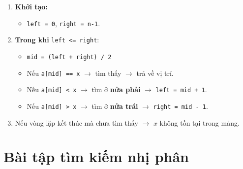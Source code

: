 \begin{enumerate}
    \item \textbf{Khởi tạo:} 
    \begin{itemize}
        \item \texttt{left = 0}, \texttt{right = n-1}.
    \end{itemize}
    
    \item \textbf{Trong khi} \texttt{left <= right}:
    \begin{itemize}
        \item \texttt{mid = (left + right) / 2}
        \item Nếu \texttt{a[mid] == x} $\rightarrow$ tìm thấy $\rightarrow$ trả về vị trí.
        \item Nếu \texttt{a[mid] < x} $\rightarrow$ tìm ở \textbf{nửa phải} $\rightarrow$ \texttt{left = mid + 1}.
        \item Nếu \texttt{a[mid] > x} $\rightarrow$ tìm ở \textbf{nửa trái} $\rightarrow$ \texttt{right = mid - 1}.
    \end{itemize}
    
    \item Nếu vòng lặp kết thúc mà chưa tìm thấy $\rightarrow$ $x$ không tồn tại trong mảng.
\end{enumerate}

\section{Bài tập tìm kiếm nhị phân}

